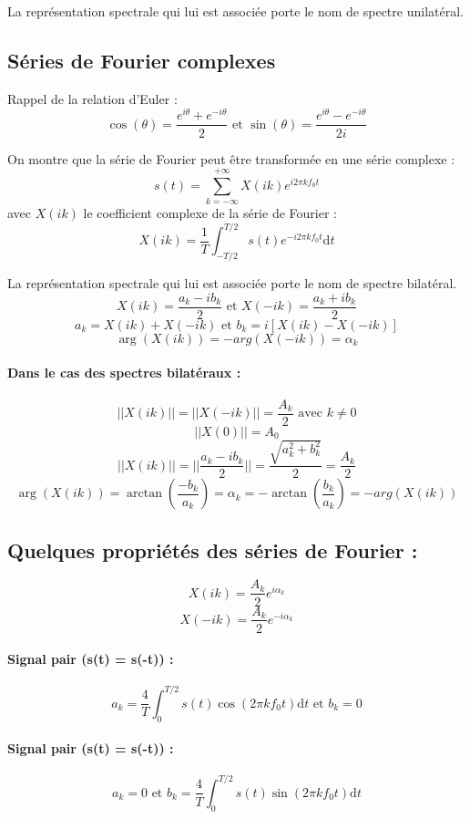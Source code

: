 \documentclass[a4paper,12pt]{report}
\begin{document}
La représentation spectrale qui lui est associée porte le nom de spectre unilatéral.

\subsection{Séries de Fourier complexes}

Rappel de la relation d'Euler :
\[ \cos(\theta) = \dfrac{e^{i\theta} + e^{-i\theta}}{2} \text{ et } \sin(\theta) = \dfrac{e^{i\theta} - e^{-i\theta}}{2i} \]

On montre que la série de Fourier peut être transformée en une série complexe :
\[ s(t) = \sum_{k = -\infty}^{+\infty} X(ik) e^{i2\pi kf_0 t} \]
avec $X(ik)$ le coefficient complexe de la série de Fourier :
\[ X(ik) = \dfrac{1}{T} \int_{-T/2}^{T/2} s(t) e^{-i2\pi kf_0 t} \mathrm{d}t \]

La représentation spectrale qui lui est associée porte le nom de spectre bilatéral.
\[ X(ik) = \dfrac{a_k - ib_k}{2} \text{ et } X(-ik) = \dfrac{a_k + ib_k}{2} \]
\[ a_k = X(ik) + X(-ik) \text{ et } b_k = i[X(ik) - X(-ik)] \]
\[ \arg(X(ik)) = -arg(X(-ik)) = \alpha_k \]

\paragraph{Dans le cas des spectres bilatéraux :}
\[ ||X(ik)|| = ||X(-ik)|| = \dfrac{A_k}{2} \text{ avec } k\neq0 \]
\[ ||X(0)|| = A_0 \]
\[ ||X(ik)|| = ||\dfrac{a_k - ib_k}{2}|| = \dfrac{\sqrt{a^{2}_{k} + b^{2}_{k}}}{2} = \dfrac{A_k}{2} \]
\[ \arg(X(ik)) = \arctan(\dfrac{-b_k}{a_k}) = \alpha_k = -\arctan(\dfrac{b_k}{a_k}) = -arg(X(ik)) \]

\subsection{Quelques propriétés des séries de Fourier :}
\[ X(ik) = \dfrac{A_k}{2} e^{i\alpha_k} \]
\[ X(-ik) = \dfrac{A_k}{2} e^{-i\alpha_k} \]

\paragraph{Signal pair (s(t) = s(-t)) :}
\[ a_k = \dfrac{4}{T} \int_{0}^{T/2} s(t) \cos(2\pi kf_0 t) \mathrm{d}t \text{ et } b_k = 0 \]

\paragraph{Signal pair (s(t) = s(-t)) :}
\[ a_k = 0 \text{ et } b_k = \dfrac{4}{T} \int_{0}^{T/2} s(t) \sin(2\pi kf_0 t) \mathrm{d}t \]
\end{document}
